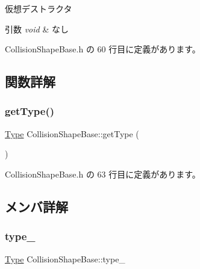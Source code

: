 仮想デストラクタ 


\begin{DoxyParams}{引数}
{\em void} & なし \\
\hline
\end{DoxyParams}


 Collision\+Shape\+Base.\+h の 60 行目に定義があります。



\subsection{関数詳解}
\mbox{\label{class_collision_shape_base_a662af47ebcd9f29d7c54047a0227b8bc}} 
\subsubsection{\texorpdfstring{get\+Type()}{getType()}}
{\footnotesize\ttfamily \mbox{\hyperlink{class_collision_shape_base_a8abcef092855ad0ca191047044b002cb}{Type}} Collision\+Shape\+Base\+::get\+Type (\begin{DoxyParamCaption}{ }\end{DoxyParamCaption})\hspace{0.3cm}{\ttfamily [inline]}}



 Collision\+Shape\+Base.\+h の 63 行目に定義があります。



\subsection{メンバ詳解}
\mbox{\label{class_collision_shape_base_a46413b1e4d4b3a35075232fa9012addb}} 
\subsubsection{\texorpdfstring{type\+\_\+}{type\_}}
{\footnotesize\ttfamily \mbox{\hyperlink{class_collision_shape_base_a8abcef092855ad0ca191047044b002cb}{Type}} Collision\+Shape\+Base\+::type\+\_\+\hspace{0.3cm}{\ttfamily [private]}}



